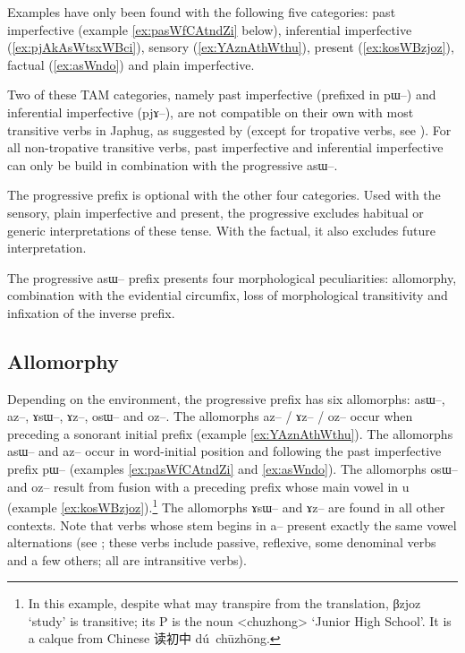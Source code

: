 \documentclass[oldfontcommands,oneside,a4paper,11pt]{article}
\newcommand{\ipa}[1]{{\phon \mbox{#1}}} %
\newcommand{\zh}[1]{{\cn #1}}
\begin{document}
Examples have only been found with the following five categories: past imperfective (example \ref{ex:pasWfCAtndZi} below), inferential imperfective (\ref{ex:pjAkAsWtsxWBci}), sensory (\ref{ex:YAznAthWthu}), present (\ref{ex:kosWBzjoz}), factual (\ref{ex:asWndo}) and plain imperfective. 

Two of these TAM categories, namely past imperfective (prefixed in \ipa{pɯ--}) and inferential imperfective (\ipa{pjɤ--}), are not compatible on their own with most transitive verbs in Japhug, as suggested by \citet{lin11direction} (except for tropative verbs, see \citealt{jacques13tropative}). For all non-tropative transitive verbs, past imperfective and inferential imperfective can only be build in combination with the progressive \ipa{asɯ--}. 

The progressive prefix is optional with the other four categories. Used with the sensory, plain imperfective and present, the progressive excludes habitual or generic interpretations of these tense. With the factual, it also excludes future interpretation.

The progressive \ipa{asɯ--} prefix presents four morphological peculiarities: allomorphy, combination with the evidential circumfix, loss of morphological transitivity and infixation of the inverse prefix.

\subsection{Allomorphy} \label{sec:prog.allomorphy}
Depending on the environment, the progressive prefix has six allomorphs: \ipa{asɯ--}, \ipa{az--}, \ipa{ɤsɯ--}, \ipa{ɤz--}, \ipa{osɯ--} and \ipa{oz--}. The allomorphs   \ipa{az--} / \ipa{ɤz--} / \ipa{oz--} occur when preceding a sonorant initial prefix (example \ref{ex:YAznAthWthu}). The allomorphs \ipa{asɯ--} and \ipa{az--} occur in word-initial position and following the past imperfective prefix \ipa{pɯ--} (examples \ref{ex:pasWfCAtndZi} and \ref{ex:asWndo}). The allomorphs \ipa{osɯ--} and \ipa{oz--} result from fusion with a preceding prefix whose main vowel in \ipa{u} (example \ref{ex:kosWBzjoz}).\footnote{In this example, despite what may transpire from the translation, \ipa{βzjoz} `study' is transitive; its P is the noun <chuzhong> `Junior High School'. It is a calque from Chinese \zh{读初中} \ipa{dú chūzhōng}.} The allomorphs \ipa{ɤsɯ--} and \ipa{ɤz--} are found in all other contexts. Note that verbs whose stem begins in \ipa{a--} present exactly the same vowel alternations (see \citealt{jacques07passif}; these verbs include passive, reflexive, some denominal verbs and a few others; all are intransitive verbs).
\end{document}
